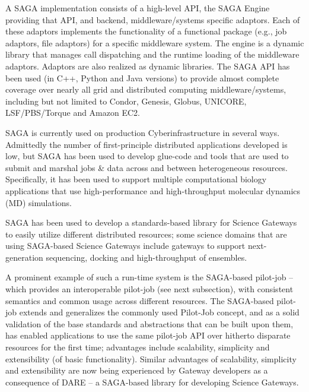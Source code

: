 \documentclass[]{svjour3}
\begin{document}
A SAGA implementation consists of a high-level API, the SAGA
Engine providing that API, and backend, middleware/systems specific
adaptors. Each of these adaptors implements the functionality of
a functional package (e.g., job adaptors, file adaptors) for a
specific middleware system. The engine is a dynamic library that
manages call dispatching and the runtime loading of the middleware
adaptors. Adaptors are also realized as dynamic libraries. The SAGA
API has been used (in C++, Python and Java versions) to provide almost
complete coverage over nearly all grid and distributed computing
middleware/systems, including but not limited to Condor, Genesis,
Globus, UNICORE, LSF/PBS/Torque and Amazon EC2.

SAGA is currently used on production Cyberinfrastructure in several ways.
Admittedly the number of first-principle distributed applications developed is
low, but SAGA has been used to develop glue-code and tools that are
used to submit and marshal jobs \& data across and between
heterogeneous resources. Specifically, it has been used to support
multiple computational biology applications that use high-performance
and high-throughput molecular dynamics (MD) simulations.

  SAGA
has been used to develop a standards-based library for Science
Gateways to easily utilize different distributed resources; some
science domains that are using SAGA-based Science Gateways include
gateways to support next-generation sequencing, docking and
high-throughput of ensembles.


  A prominent example of
such a run-time system is the SAGA-based pilot-job – which provides an
interoperable pilot-job (see next subsection), with consistent
semantics and common usage across different resources. The SAGA-based
pilot-job extends and generalizes the commonly used Pilot-Job concept,
and as a solid validation of the base standards and abstractions that
can be built upon them, has enabled applications to use the same
pilot-job API over hitherto disparate resources for the first time;
advantages include scalability, simplicity and extensibility (of basic
functionality). Similar advantages of scalability, simplicity and
extensibility are now being experienced by Gateway developers as a
consequence of DARE – a SAGA-based library for developing Science
Gateways.
\end{document}
